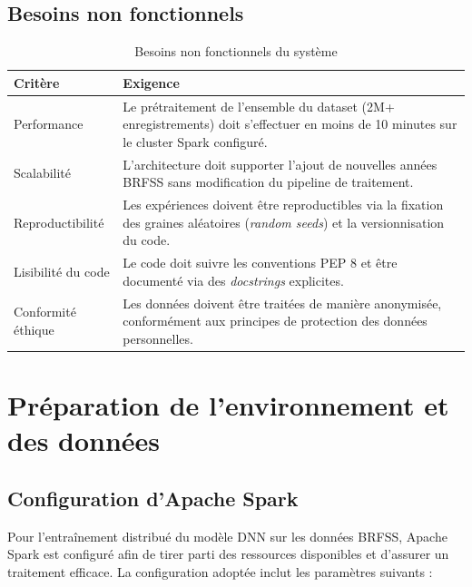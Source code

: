 \documentclass[12pt,a4paper]{report}
\begin{document}
\subsection{Besoins non fonctionnels}

\begin{table}[H]
\centering
\caption{Besoins non fonctionnels du système}
\label{tab:non_func}
\begin{tabularx}{\textwidth}{L{3cm} X}
\toprule
\textbf{Critère} & \textbf{Exigence} \\
\midrule
Performance
  & Le prétraitement de l'ensemble du dataset (2M+ enregistrements) doit s'effectuer
    en moins de 10 minutes sur le cluster Spark configuré. \\
\addlinespace
Scalabilité
  & L'architecture doit supporter l'ajout de nouvelles années \acs{BRFSS} sans
    modification du pipeline de traitement. \\
\addlinespace
Reproductibilité
  & Les expériences doivent être reproductibles via la fixation des graines
    aléatoires (\textit{random seeds}) et la versionnisation du code. \\
\addlinespace
Lisibilité du code
  & Le code doit suivre les conventions PEP 8 et être documenté via des
    \textit{docstrings} explicites. \\
\addlinespace
Conformité éthique
  & Les données doivent être traitées de manière anonymisée, conformément
    aux principes de protection des données personnelles. \\
\bottomrule
\end{tabularx}
\end{table}

\section{Préparation de l'environnement et des données}

\subsection{Configuration d'Apache Spark}

Pour l'entraînement distribué du modèle \acs{DNN} sur les données \acs{BRFSS},
Apache Spark est configuré afin de tirer parti des ressources disponibles et
d'assurer un traitement efficace. La configuration adoptée inclut les paramètres
suivants :
\end{document}
